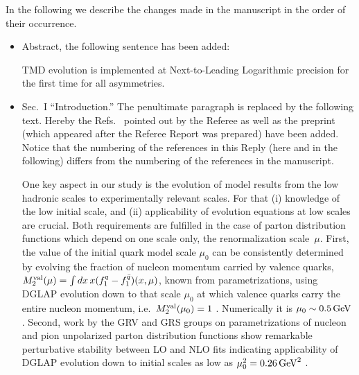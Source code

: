 \documentclass[a4paper]{article}
\newcommand{\bakur}[1]{{\color{blue}#1}}
\newcommand{\comment}[1]{{\color{blue}#1}}
\begin{document}
In the following we describe the changes made in the manuscript in
the order of their occurrence.

\begin{itemize}

\item\comment{
Abstract, the following sentence has been added:}

TMD evolution is implemented at Next-to-Leading Logarithmic precision for
the first time for all asymmetries. 


\item\comment{
Sec.~I ``Introduction.'' The penultimate paragraph is replaced by the
following text. Hereby the Refs.~\cite{Gehrmann:2014yya,Echevarria:2015byo,Echevarria:2015usa,Echevarria:2016scs,Li:2016ctv,Vladimirov:2016dll,Luo:2019hmp,Luo:2019szz,Ebert:2020yqt,Gutierrez-Reyes:2017glx,Gutierrez-Reyes:2018iod,Ji:2006ub,Koike:2007dg,Sun:2013hua,Dai:2014ala,Scimemi:2019gge,Collins:1981va,Aybat:2011zv,Angeles-Martinez:2015sea,Ebert:2020dfc} 
pointed out by the Referee as well as the preprint \cite{Moos:2020wvd} 
(which appeared after the Referee Report was prepared) have been added.
Notice that the numbering of the references in this Reply (here and in the
following) differs from the numbering of the references in the manuscript.}

One key aspect in our study is the evolution of model results from 
the low hadronic scales to experimentally relevant scales. For that 
(i) knowledge of the low initial scale, and (ii) applicability of evolution 
equations at low scales are crucial. Both requirements are fulfilled in
the case of parton distribution functions which depend on one scale only, 
the renormalization scale~$\mu$.
First, the value of the initial quark model scale $\mu_0$ can be consistently
determined by evolving the fraction of nucleon momentum carried by valence 
quarks, $M_2^{\rm val}(\mu) = \int dx\,x(f_1^q-f_1^{\bar q})(x,\mu)$,
known from parametrizations, using DGLAP evolution down to that scale
$\mu_0$ at which valence quarks carry the entire nucleon momentum, 
i.e.\ $M_2^{\rm val}(\mu_0) = 1$ \cite{Traini:1997jz}. 
Numerically it is $\mu_0\sim 0.5\,{\rm GeV}$. %
Second, work by the GRV and GRS groups on parametrizations of nucleon and 
pion unpolarized parton distribution functions show remarkable perturbative
stability between LO and NLO fits indicating applicability of DGLAP 
evolution down to initial scales as low as $\mu_0^2 = 0.26\,{\rm GeV}^2$ 
\cite{Gluck:1991ng,Gluck:1991ey,Gluck:1994uf,Gluck:1998xa,Gluck:1999xe}.


\end{itemize}
\end{document}
